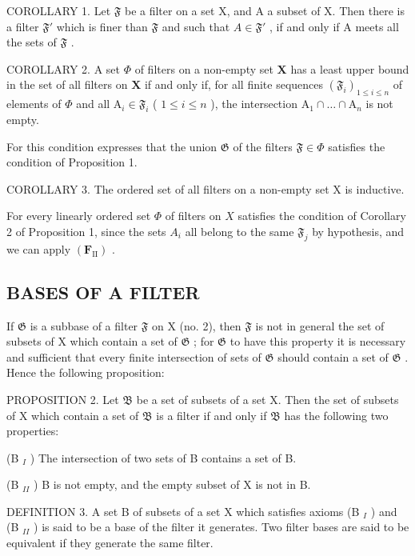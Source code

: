 COROLLARY 1. Let \(\mathfrak{F}\) be a filter on a set X, and A a subset of X. Then there is a filter \(\mathfrak{F}'\) which is finer than \(\mathfrak{F}\) and such that \(A \in \mathfrak{F}'\) , if and only if A meets all the sets of \(\mathfrak{F}\) .

COROLLARY 2. A set \(\Phi\) of filters on a non-empty set \(\mathbf{X}\) has a least upper bound in the set of all filters on \(\mathbf{X}\) if and only if, for all finite sequences \((\mathfrak{F}_i)_{1\leqslant i\leqslant n}\) of elements of \(\Phi\) and all \(\mathrm{A}_i\in \mathfrak{F}_i\) ( \(1\leqslant i\leqslant n\) ), the intersection \(\mathrm{A}_1\cap \dots \cap \mathrm{A}_n\) is not empty.

For this condition expresses that the union \(\mathfrak{G}\) of the filters \(\mathfrak{F} \in \Phi\) satisfies the condition of Proposition 1.

COROLLARY 3. The ordered set of all filters on a non-empty set X is inductive.

For every linearly ordered set \(\Phi\) of filters on \(X\) satisfies the condition of Corollary 2 of Proposition 1, since the sets \(A_{i}\) all belong to the same \(\mathfrak{F}_{j}\) by hypothesis, and we can apply \((\mathbf{F}_{\mathrm{II}})\) .

\subsection{BASES OF A FILTER}

If \(\mathfrak{G}\) is a subbase of a filter \(\mathfrak{F}\) on X (no. 2), then \(\mathfrak{F}\) is not in general the set of subsets of X which contain a set of \(\mathfrak{G}\) ; for \(\mathfrak{G}\) to have this property it is necessary and sufficient that every finite intersection of sets of \(\mathfrak{G}\) should contain a set of \(\mathfrak{G}\) . Hence the following proposition:

PROPOSITION 2. Let \(\mathfrak{B}\) be a set of subsets of a set X. Then the set of subsets of X which contain a set of \(\mathfrak{B}\) is a filter if and only if \(\mathfrak{B}\) has the following two properties:

(B \(_{I}\) ) The intersection of two sets of B contains a set of B.

(B \(_{II}\) ) B is not empty, and the empty subset of X is not in B.

DEFINITION 3. A set B of subsets of a set X which satisfies axioms (B \(_{I}\) ) and (B \(_{II}\) ) is said to be a base of the filter it generates. Two filter bases are said to be equivalent if they generate the same filter.

